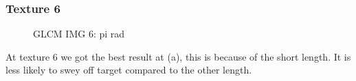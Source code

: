 \documentclass{article}
\begin{document}
	\subsubsection{Texture 6}
		\begin{figure}[h]%
			\centering
    		\qquad
    		\qquad
    		    		\qquad

    		\caption{GLCM IMG 6: pi rad}%
    		\label{fig:GLCM_6}%
		\end{figure}
		At texture 6 we got the best result at (a), this is because of the short length. It is less likely to swey off target compared to the other length.		
		
\end{document}
